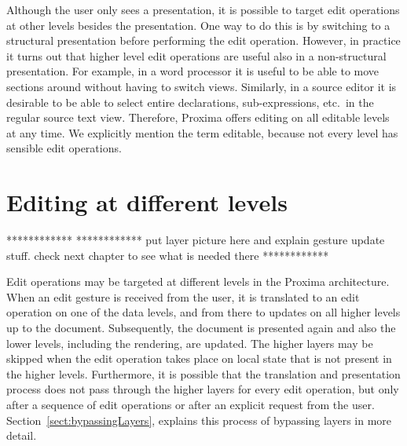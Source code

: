 Although the user only sees a presentation, it is possible to target edit operations at other levels besides the presentation. One way to do this is by switching to a structural presentation before performing the edit operation. However, in practice it turns out that higher level edit operations are useful also in a non-structural presentation. For example, in a word processor it is useful to be able to move sections around without having to switch views. Similarly, in a source editor it is desirable to be able to select entire declarations, sub-expressions, etc.\ in the regular source text view. Therefore, Proxima offers editing on all editable levels at any time. We explicitly mention the term editable, because not every level has sensible edit operations. 









%									
%									
%									
\section{Editing at different levels}



************
************ put layer picture here and explain gesture update stuff. check next chapter to see what is needed there
************

Edit operations may be targeted at different levels in the Proxima architecture. When an edit gesture is received from the user, it is translated to an edit operation on one of the data levels, and from there to updates on all higher levels up to the document. Subsequently, the document is presented again and also the lower levels, including the rendering, are updated. The higher layers may be skipped when the edit operation takes place on local state that is not present in the higher levels. Furthermore, it is possible that the translation and presentation process does not pass through the higher layers for every edit operation, but only after a sequence of edit operations or after an explicit request from the user. Section~\ref{sect:bypassingLayers}, explains this process of bypassing layers in more detail.

